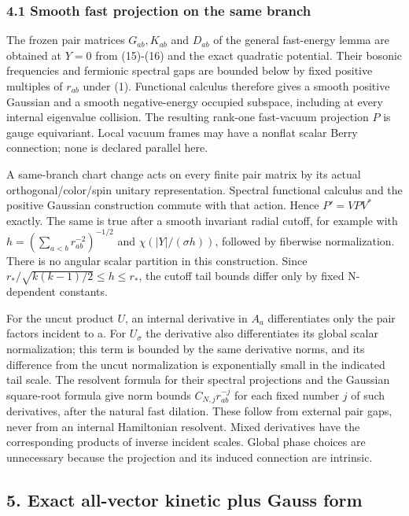 \subsubsection{4.1 Smooth fast projection on the same
branch}\label{a-smooth-fast-projection-on-the-same-branch}

The frozen pair matrices \(G_{ab}, K_{ab}\) and \(D_{ab}\) of the
general fast-energy lemma are obtained at \(Y=0\) from (15)-(16) and the
exact quadratic potential. Their bosonic frequencies and fermionic
spectral gaps are bounded below by fixed positive multiples of
\(r_{ab}\) under (1). Functional calculus therefore gives a smooth
positive Gaussian and a smooth negative-energy occupied subspace,
including at every internal eigenvalue collision. The resulting rank-one
fast-vacuum projection \(P\) is gauge equivariant. Local vacuum frames
may have a nonflat scalar Berry connection; none is declared parallel
here.

A same-branch chart change acts on every finite pair matrix by its
actual orthogonal/color/spin unitary representation. Spectral functional
calculus and the positive Gaussian construction commute with that
action. Hence \(P'=V P V^{*}\) exactly. The same is true after a smooth
invariant radial cutoff, for example with
\(h=(\sum _{a<b}r_{ab}^{-2})^{-1/2}\) and
\(\chi (\vert Y\vert /(\sigma  h))\), followed by fiberwise
normalization. There is no angular scalar partition in this
construction. Since \(r_{*}/\sqrt{k(k-1)/2}\le h\le r_{*}\), the cutoff
tail bounds differ only by fixed N-dependent constants.

For the uncut product \(U\), an internal derivative in \(A_{a}\)
differentiates only the pair factors incident to a. For \(U_{\sigma}\)
the derivative also differentiates its global scalar normalization; this
term is bounded by the same derivative norms, and its difference from
the uncut normalization is exponentially small in the indicated tail
scale. The resolvent formula for their spectral projections and the
Gaussian square-root formula give norm bounds \(C_{N,j} r_{ab}^{-j}\)
for each fixed number \(j\) of such derivatives, after the natural fast
dilation. These follow from external pair gaps, never from an internal
Hamiltonian resolvent. Mixed derivatives have the corresponding products
of inverse incident scales. Global phase choices are unnecessary because
the projection and its induced connection are intrinsic.

\subsection{5. Exact all-vector kinetic plus Gauss
form}\label{a-exact-all-vector-kinetic-plus-gauss-form}

